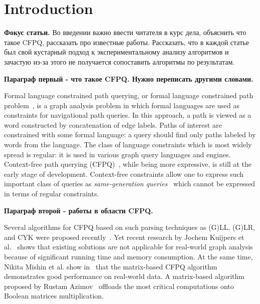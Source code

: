 \section{Introduction}
\textbf{Фокус статьи.}
Во введении важно ввести читателя в курс дела, объяснить что такое CFPQ, рассказать про известные работы.
Рассказать, что в каждой статье был свой кустарный подход к экспериментальному анализу алгоритмов и зачастую из-за этого не получается сопоставить алгоритмы по результатам.

\textbf{Параграф первый - что такое CFPQ. Нужно переписать другими словами.}

Formal language constrained path querying, or formal language constrained path problem~\cite{barrett2000formal}, is a graph analysis problem in which formal languages are used as constraints for navigational path queries.
In this approach, a path is viewed as a word constructed by concatenation of edge labels.
Paths of interest are constrained with some formal language: a query should find only paths labeled by words from the language.
The class of language constraints which is most widely spread is regular: it is used in various graph query languages and engines.
Context-free path querying (CFPQ)~\cite{Yannakakis}, while being more expressive, is still at the early stage of development.
Context-free constraints allow one to express such important class of queries as \textit{same-generation queries}~\cite{FndDB} which cannot be expressed in terms of regular constraints.

\textbf{Параграф второй - работы в области CFPQ.}

Several algorithms for CFPQ based on such parsing techniques as (G)LL, (G)LR, and CYK were proposed recently~\cite{bradford2007quickest,ward2008distributed,bradford2016fast,hellingsPathQuerying,Grigorev:2017:CPQ:3166094.3166104,Verbitskaia:2018:PCC:3241653.3241655,RDF,10.1007/978-3-319-91662-0_17,Medeiros:2018:EEC:3167132.3167265}.
Yet recent research by Jochem Kuijpers et al.~\cite{Kuijpers:2019:ESC:3335783.3335791} shows that existing solutions are not applicable for real-world graph analysis because of significant running time and memory consumption.
At the same time, Nikita Mishin et al. show in~\cite{Mishin:2019:ECP:3327964.3328503} that the matrix-based CFPQ algorithm demonstrates good performance on real-world data.
A matrix-based algorithm proposed by Rustam Azimov~\cite{Azimov:2018:CPQ:3210259.3210264} offloads the most critical computations onto Boolean matrices multiplication.

